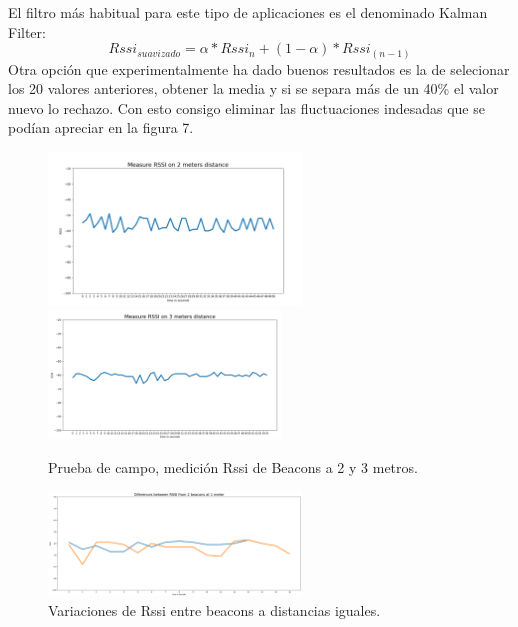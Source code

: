 \documentclass[paper=a4, fontsize=11pt,twoside]{scrartcl}	%
\begin{document}
            El filtro más habitual para este tipo de aplicaciones es el denominado Kalman Filter:
            \begin{equation}
                Rssi_{suavizado} = \alpha * Rssi_{n} + (1-\alpha) * Rssi_{(n-1)}
            \end{equation}
            Otra opción que experimentalmente ha dado buenos resultados es la de selecionar los 20 valores anteriores,
            obtener la media y si se separa más de un 40\% el valor nuevo lo rechazo. Con esto consigo eliminar las 
            fluctuaciones indesadas que se podían apreciar en la figura 7.
            \begin{center}
                \begin{figure}[ht]
                    \centering
                    \includegraphics[width=0.6\textwidth]{1_beacon_2_meters.PNG}
                    \includegraphics[width=0.55\textwidth]{1_beacon_3_meters.PNG}
                    \caption{Prueba de campo, medición Rssi de Beacons a 2 y 3 metros.}
                    \label{fig:mesh5}
                \end{figure}
            \end{center}
            \begin{center}
                \begin{figure}[ht]
                    \centering
                    \includegraphics[width=0.6\textwidth]{10min_2beacons_same_distance.PNG}
                    \caption{Variaciones de Rssi entre beacons a distancias iguales.}
                    \label{fig:mesh6}
                \end{figure}
            \end{center}
\end{document}
